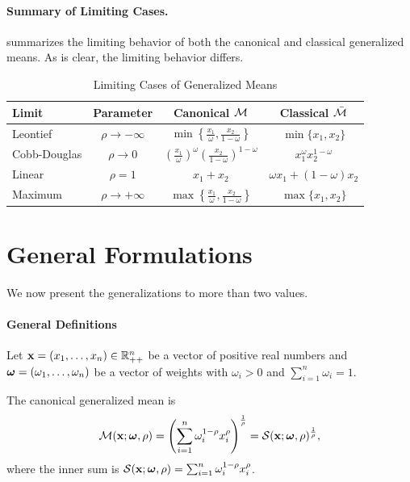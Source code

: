 \paragraph{Summary of Limiting Cases.}

 summarizes the limiting behavior of both the canonical and classical generalized means. As is clear, the limiting behavior differs.

\begin{table}[htbp]
\centering
\caption{Limiting Cases of Generalized Means}
\label{tab:limiting-cases}
\begin{tabular}{@{}lccc@{}}
\toprule
\textbf{Limit} & \textbf{Parameter} & \textbf{Canonical $\mathcal{M}$} & \textbf{Classical $\bar{\mathcal{M}}$} \\
\midrule
Leontief & $\rho \to -\infty$ & $\min\left\{ \frac{x_1}{\omega}, \frac{x_2}{1-\omega} \right\}$ & $\min\{x_1, x_2\}$ \\[6pt]
Cobb-Douglas & $\rho \to 0$ & $\left( \frac{x_1}{\omega} \right)^\omega \left( \frac{x_2}{1-\omega} \right)^{1-\omega}$ & $x_1^\omega x_2^{1-\omega}$ \\[6pt]
Linear & $\rho = 1$ & $x_1 + x_2$ & $\omega x_1 + (1-\omega) x_2$ \\[6pt]
Maximum & $\rho \to +\infty$ & $\max\left\{ \frac{x_1}{\omega}, \frac{x_2}{1-\omega} \right\}$ & $\max\{x_1, x_2\}$ \\
\bottomrule
\end{tabular}
\end{table}

\section{General Formulations}

We now present the generalizations to more than two values. 

\paragraph{General Definitions}

Let $\mathbf{x} = (x_1, \ldots, x_n) \in \mathbb{R}_{++}^n$ be a vector of positive real numbers and $\boldsymbol{\omega} = (\omega_1, \ldots, \omega_n)$ be a vector of weights with $\omega_i > 0$ and $\sum_{i=1}^n \omega_i = 1$.

\begin{definition}
\label{def:general-canonical}
The canonical generalized mean is
\begin{equation}
\label{eq:general-canonical}
\mathcal{M}(\mathbf{x}; \boldsymbol{\omega}, \rho) = \left( \sum_{i=1}^n \omega_i^{1-\rho} x_i^\rho \right)^{\frac{1}{\rho}} = \mathcal{S}(\mathbf{x}; \boldsymbol{\omega}, \rho)^{\frac{1}{\rho}},
\end{equation}
where the inner sum is $\mathcal{S}(\mathbf{x}; \boldsymbol{\omega}, \rho) = \sum_{i=1}^n \omega_i^{1-\rho} x_i^\rho$.
\end{definition}

